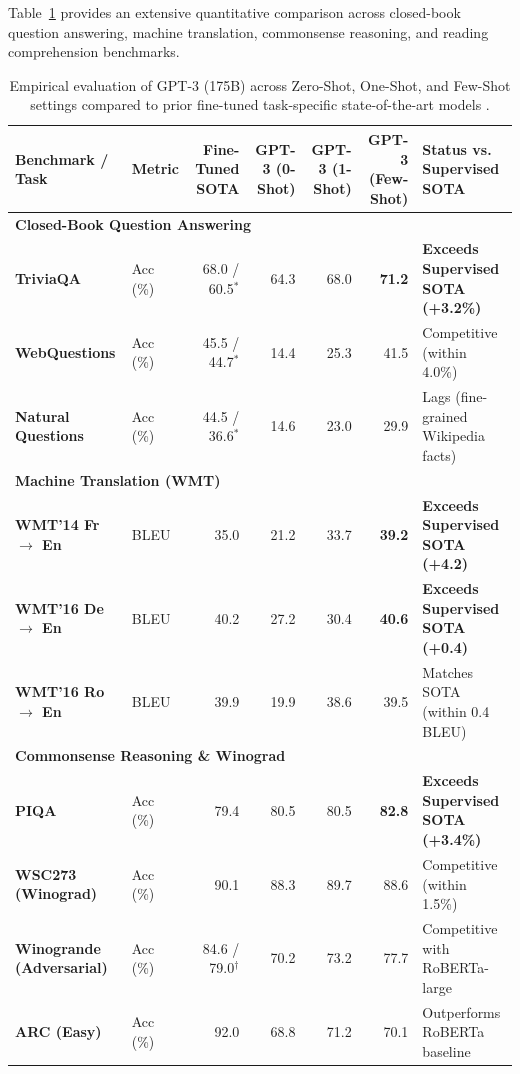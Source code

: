\documentclass[../../main.tex]{subfiles}
\begin{document}
Table~\ref{tab:gpt3_vs_sota} provides an extensive quantitative comparison across closed-book question answering, machine translation, commonsense reasoning, and reading comprehension benchmarks.

\begin{table}[t]
\centering
\small
\caption{Empirical evaluation of GPT-3 (175B) across Zero-Shot, One-Shot, and Few-Shot settings compared to prior fine-tuned task-specific state-of-the-art models \cite{brown2020}.}
\label{tab:gpt3_vs_sota}
\begin{tabularx}{\textwidth}{l l r r r r X}
\toprule
\textbf{Benchmark / Task} & \textbf{Metric} & \textbf{Fine-Tuned SOTA} & \textbf{GPT-3 (0-Shot)} & \textbf{GPT-3 (1-Shot)} & \textbf{GPT-3 (Few-Shot)} & \textbf{Status vs. Supervised SOTA} \\
\midrule
\multicolumn{7}{l}{\textbf{Closed-Book Question Answering}} \\
\textbf{TriviaQA} & Acc (\%) & 68.0 / 60.5$^*$ & 64.3 & 68.0 & \textbf{71.2} & \textbf{Exceeds Supervised SOTA (+3.2\%)} \\
\textbf{WebQuestions} & Acc (\%) & 45.5 / 44.7$^*$ & 14.4 & 25.3 & 41.5 & Competitive (within 4.0\%) \\
\textbf{Natural Questions} & Acc (\%) & 44.5 / 36.6$^*$ & 14.6 & 23.0 & 29.9 & Lags (fine-grained Wikipedia facts) \\
\midrule
\multicolumn{7}{l}{\textbf{Machine Translation (WMT)}} \\
\textbf{WMT'14 Fr $\to$ En} & BLEU & 35.0 & 21.2 & 33.7 & \textbf{39.2} & \textbf{Exceeds Supervised SOTA (+4.2)} \\
\textbf{WMT'16 De $\to$ En} & BLEU & 40.2 & 27.2 & 30.4 & \textbf{40.6} & \textbf{Exceeds Supervised SOTA (+0.4)} \\
\textbf{WMT'16 Ro $\to$ En} & BLEU & 39.9 & 19.9 & 38.6 & 39.5 & Matches SOTA (within 0.4 BLEU) \\
\midrule
\multicolumn{7}{l}{\textbf{Commonsense Reasoning \& Winograd}} \\
\textbf{PIQA} & Acc (\%) & 79.4 & 80.5 & 80.5 & \textbf{82.8} & \textbf{Exceeds Supervised SOTA (+3.4\%)} \\
\textbf{WSC273 (Winograd)} & Acc (\%) & 90.1 & 88.3 & 89.7 & 88.6 & Competitive (within 1.5\%) \\
\textbf{Winogrande (Adversarial)} & Acc (\%) & 84.6 / 79.0$^\dagger$ & 70.2 & 73.2 & 77.7 & Competitive with RoBERTa-large \\
\textbf{ARC (Easy)} & Acc (\%) & 92.0 & 68.8 & 71.2 & 70.1 & Outperforms RoBERTa baseline \\

\end{tabularx}
\end{table}
\end{document}
